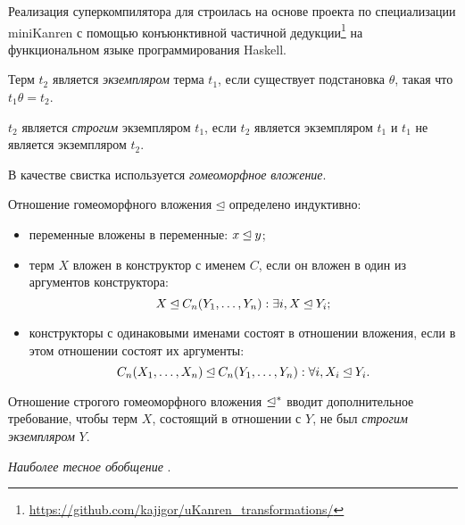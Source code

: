 Реализация суперкомпилятора для \ukanren строилась на основе проекта по специализации miniKanren с помощью конъюнктивной частичной
дедукции\footnote{\url{https://github.com/kajigor/uKanren_transformations/}} на функциональном языке программирования Haskell.


Терм $t_2$ является \emph{экземпляром}  терма $t_1$, если
существует подстановка $\theta$, такая что $t_1 \theta = t_2$.

$t_2$ является \emph{строгим} экземпляром $t_1$, если  $t_2$ является экземпляром $t_1$ и
$t_1$ не является экземпляром $t_2$.



В качестве свистка используется \emph{гомеоморфное вложение}\cite{scGen}.

Отношение гомеоморфного вложения $\unlhd$ определено индуктивно:
\begin{itemize}
\item переменные вложены в переменные: $x \unlhd y$;
\item терм $X$ вложен в конструктор с именем $C$, если он вложен в один из аргументов конструктора:
      $$X \unlhd C_n(Y_1, \dots, Y_n): \exists i, X \unlhd Y_i;$$
\item конструкторы с одинаковыми именами состоят в отношении вложения, если в этом отношении
      состоят их аргументы:
      $$C_n(X_1, \dots, X_n) \unlhd C_n(Y_1, \dots, Y_n): \forall i, X_i \unlhd Y_i.$$
\end{itemize}

Отношение строгого гомеоморфного вложения $\unlhd^*$ вводит дополнительное
требование, чтобы терм $X$, состоящий в отношении с $Y$, не был \emph{строгим экземпляром} $Y$. 


\emph{Наиболее тесное обобщение}  .


